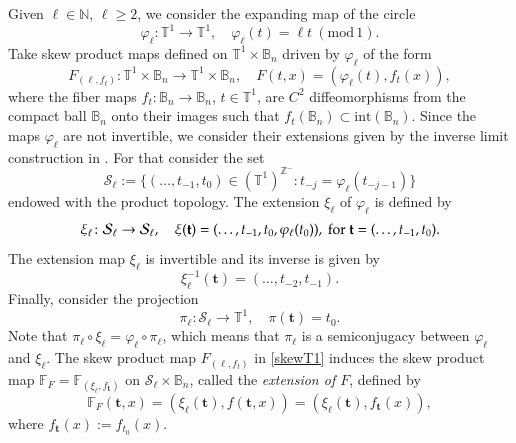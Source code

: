 \documentclass[11pt,reqno]{amsart}
\theoremstyle{plain}
\newtheorem*{theorem A}{Theorem A}
\newtheorem*{theorem B}{Theorem B}
\newtheorem*{theorem C}{Theorem C}
\newtheorem*{theorem 1}{Theorem 1}
\newtheorem*{theorem 2}{Theorem 2}
\newtheorem*{theorem 3}{Theorem 3}
\numberwithin{equation}{section}
\begin{document}
Given $\ell\in \mathbb{N}$, $\ell\ge 2$, we consider the expanding map of the circle
$$
\varphi_\ell \colon \mathbb{T}^1 \to \mathbb{T}^1,\quad \varphi_\ell (t) = \ell t \ (\mathrm{mod\, 1}).
$$
Take skew product maps defined on $\mathbb{T}^1\times \mathbb{B}_n$ driven by $\varphi_\ell$ of the form
\begin{equation}\label{skewT1}
 F_{(\ell, f_t)} \colon \mathbb{T}^1\times \mathbb{B}_n \to \mathbb{T}^1\times \mathbb{B}_n, \quad F (t,x)=(\varphi_\ell(t), f_t(x)),
\end{equation}
where the fiber maps $f_t \colon \mathbb{B}_n \to \mathbb{B}_n$, $t \in \mathbb{T}^1$, are $C^2$ diffeomorphisms from the compact ball $\mathbb{B}_n$ onto their images such that $f_t(\mathbb{B}_n)\subset \text{int}(\mathbb{B}_n)$.
Since the maps $\varphi_\ell$ are not invertible, we consider their extensions given by the inverse limit construction in \cite{williams1974expanding}.
For that consider the set
$$
\mathcal{S}_\ell :=\{(\ldots,t_{-1},t_{0})\in (\mathbb{T}^1)^{\mathbb{Z}^-}: t_{-j}=\varphi_\ell (t_{-j-1})\}
$$
endowed with the product topology. The extension $\xi_\ell$ of $\varphi_\ell$ is defined by
\begin{equation*}\label{3.9}
\xi_\ell \colon \mathcal{S}_\ell \to \mathcal{S}_\ell, \quad \xi(\textbf{t})=(\ldots,t_{-1},t_{0},\varphi_\ell(t_0)), \ \textnormal{for} \ \textbf{t}=(\ldots,t_{-1},t_{0}).
\end{equation*}
The extension map $\xi_\ell$ is invertible and its inverse is given by
\begin{equation*}
\xi_\ell^{-1}(\textbf{t})=(\ldots,t_{-2},t_{-1}).
\end{equation*}
Finally, consider the projection
\begin{equation}\label{e99}
\pi_\ell \colon \mathcal{S}_\ell \rightarrow \mathbb{T}^1, \quad \pi(\textbf{t})=t_0.
\end{equation}
Note that $\pi_\ell \circ \xi_\ell=\varphi_\ell \circ \pi_\ell$, which means that $\pi_\ell$ is a semiconjugacy between $\varphi_\ell$ and $\xi_\ell$.
The skew product map $F_{(\ell, f_t)}$ in \eqref{skewT1} induces the skew product map $\mathbb{F}_{F}=\mathbb{F}_{(\xi_\ell, f_{\textbf{t}})}$ on $\mathcal{S}_\ell \times \mathbb{B}_n$, called the \emph{extension of $F$}, defined by
\begin{equation}\label{skew4}
\mathbb{F}_{F}(\textbf{t},x)=(\xi_\ell(\textbf{t}),f(\textbf{t},x))=(\xi_\ell(\textbf{t}),f_{\textbf{t}}(x)),
\end{equation}
where $f_{\textbf{t}}(x):=f_{t_0}(x)$.
\end{document}
